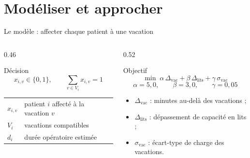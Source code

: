 \section{Modéliser et approcher}

\begin{frame}{Le modèle : affecter chaque patient à une vacation}
  \scriptsize
  \begin{columns}[T,onlytextwidth]
    \begin{column}{0.46\textwidth}
      \begin{block}{Décision}
        \[
          x_{i,v}\in\{0,1\},\qquad
          \sum_{v\in V_i}x_{i,v}=1
        \]
        \begin{tabular}{@{}ll@{}}
          $x_{i,v}$ & patient $i$ affecté à la vacation $v$ \\
          $V_i$ & vacations compatibles \\
          $d_i$ & durée opératoire estimée \\
        \end{tabular}
      \end{block}

    \end{column}

    \begin{column}{0.52\textwidth}
      \begin{alertblock}{Objectif}
        \[
          \min\; \alpha\,\Delta_{\text{vac}}
          +\beta\,\Delta_{\text{lits}}
          +\gamma\,\sigma_{\text{vac}}
        \]
        \[
          \alpha=5{,}0,\qquad \beta=3{,}0,\qquad \gamma=0{,}05
        \]
        \begin{itemize}
          \item $\Delta_{\text{vac}}$ : minutes au-delà des vacations ;
          \item $\Delta_{\text{lits}}$ : dépassement de capacité en lits ;
          \item $\sigma_{\text{vac}}$ : écart-type de charge des vacations.
        \end{itemize}
      \end{alertblock}
    \end{column}
  \end{columns}
\end{frame}

